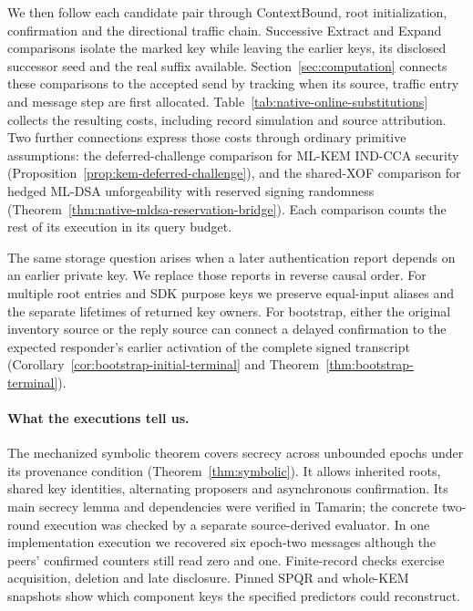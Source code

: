 We then follow each candidate pair through ContextBound, root
initialization, confirmation and the directional traffic chain.
Successive Extract and Expand comparisons isolate the marked key while
leaving the earlier keys, its disclosed successor seed and the real
suffix available. Section~\ref{sec:computation} connects these comparisons
to the accepted send by tracking when its source, traffic entry and
message step are first allocated.
Table~\ref{tab:native-online-substitutions} collects the resulting costs,
including record simulation and source attribution. Two further
connections express those costs through ordinary primitive assumptions:
the deferred-challenge comparison for ML-KEM IND-CCA security
(Proposition~\ref{prop:kem-deferred-challenge}), and the shared-XOF
comparison for hedged ML-DSA unforgeability with reserved signing
randomness (Theorem~\ref{thm:native-mldsa-reservation-bridge}). Each
comparison counts the rest of its execution in its query budget.

The same storage question arises when a later authentication report
depends on an earlier private key. We replace those reports in reverse
causal order. For multiple root entries and SDK purpose keys we preserve
equal-input aliases and the separate lifetimes of returned key owners.
For bootstrap, either the original inventory source or the reply source
can connect a delayed confirmation to the expected responder's earlier
activation of the complete signed transcript
(Corollary~\ref{cor:bootstrap-initial-terminal} and
Theorem~\ref{thm:bootstrap-terminal}).

\paragraph{What the executions tell us.}
The mechanized symbolic theorem covers secrecy across unbounded epochs
under its provenance condition (Theorem~\ref{thm:symbolic}). It allows
inherited roots, shared key identities, alternating proposers and
asynchronous confirmation. Its main secrecy lemma and dependencies were
verified in Tamarin; the concrete two-round execution was checked by a
separate source-derived evaluator. In one implementation execution we recovered six
epoch-two messages although the peers' confirmed counters still read
zero and one. Finite-record checks exercise acquisition, deletion and
late disclosure. Pinned SPQR and whole-KEM snapshots show which
component keys the specified predictors could reconstruct.

